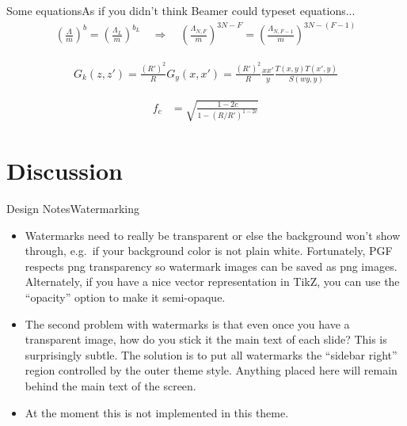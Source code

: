 \begin{frame}[c]{Some equations}{As if you didn't think Beamer could typeset equations...}
	\begin{align*}
		\left(\frac{\Lambda}{m}\right)^b = \left(\frac{\Lambda_L}{m}\right)^{b_L} \quad\Rightarrow\quad \left(\frac{\Lambda_{N,F}}{m}\right)^{3N-F}=\left(\frac{\Lambda_{N,F-1}}{m}\right)^{3N-(F-1)}
	\end{align*}	
	
	\begin{align*}
		G_k(z,z') = \frac{(R')^2}{R} G_y(x,x') = \frac{(R')^2}{R} \frac{xx'}{y} \frac{T(x,y)T(x',y)}{S(wy,y)}
	\end{align*}

	\begin{align*}
	f_c &=\sqrt{\frac{1-2c}{1-(R/R')^{1-2c}}}
	\end{align*}

\end{frame}





\section{Discussion}

\begin{frame}[t]{Design Notes}{Watermarking}
	\begin{itemize}
		\item Watermarks need to really be \alert{transparent} or else the background won't show through, e.g.\ if your background color is not plain white. Fortunately, PGF respects png transparency so watermark images can be saved as png images. Alternately, if you have a nice vector representation in TikZ, you can use the ``opacity'' option to make it semi-opaque.
		\item The second problem with watermarks is that even once you have a transparent image, how do you stick it  the main text of each slide? This is surprisingly subtle. The solution is to put all watermarks the ``sidebar right'' region controlled by the outer theme style. Anything placed here will remain \alert{behind} the main text of the screen.
		\item At the moment this is not implemented in this theme.
	\end{itemize}
\end{frame}





